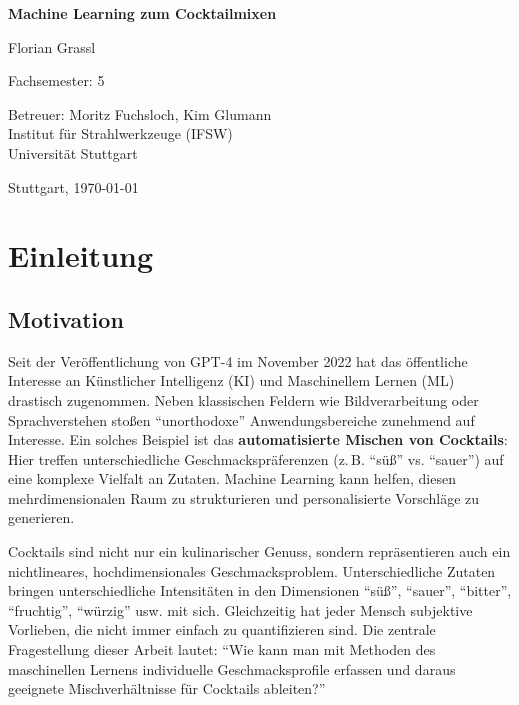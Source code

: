 \documentclass[12pt,a4paper]{report}
\begin{document}
\begin{titlepage}
    \centering
    \vspace*{3cm}
    {\huge \textbf{Machine Learning zum Cocktailmixen} \par}
    \vspace{2cm}
    {\large Florian Grassl \par}
    \vspace{1cm}
    Fachsemester: 5 \par
    \vspace{1cm}
    Betreuer: Moritz Fuchsloch, Kim Glumann \\
    Institut für Strahlwerkzeuge (IFSW) \\
    Universität Stuttgart \par
    \vfill
    Stuttgart, \today
\end{titlepage}

\tableofcontents
\clearpage

\chapter{Einleitung}

\section{Motivation}
Seit der Veröffentlichung von GPT-4 im November 2022 hat das öffentliche Interesse an Künstlicher Intelligenz (KI) und Maschinellem Lernen (ML) drastisch zugenommen. Neben klassischen Feldern wie Bildverarbeitung oder Sprachverstehen stoßen \enquote{unorthodoxe} Anwendungsbereiche zunehmend auf Interesse. Ein solches Beispiel ist das \textbf{automatisierte Mischen von Cocktails}: Hier treffen unterschiedliche Geschmackspräferenzen (z.\,B. \enquote{süß} vs. \enquote{sauer}) auf eine komplexe Vielfalt an Zutaten. Machine Learning kann helfen, diesen mehrdimensionalen Raum zu strukturieren und personalisierte Vorschläge zu generieren.

Cocktails sind nicht nur ein kulinarischer Genuss, sondern repräsentieren auch ein nichtlineares, hochdimensionales Geschmacksproblem. Unterschiedliche Zutaten bringen unterschiedliche Intensitäten in den Dimensionen \enquote{süß}, \enquote{sauer}, \enquote{bitter}, \enquote{fruchtig}, \enquote{würzig} usw. mit sich. Gleichzeitig hat jeder Mensch subjektive Vorlieben, die nicht immer einfach zu quantifizieren sind. Die zentrale Fragestellung dieser Arbeit lautet: \enquote{Wie kann man mit Methoden des maschinellen Lernens individuelle Geschmacksprofile erfassen und daraus geeignete Mischverhältnisse für Cocktails ableiten?}
\end{document}
